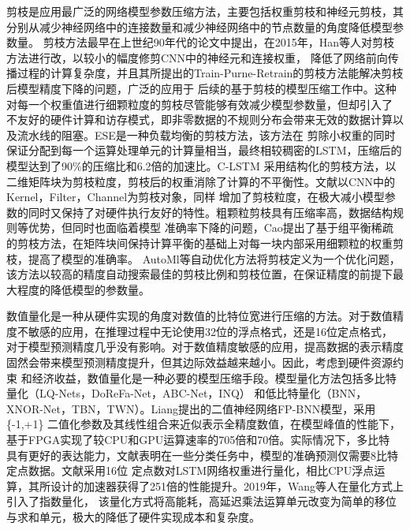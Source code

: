剪枝是应用最广泛的网络模型参数压缩方法，主要包括权重剪枝和神经元剪枝，其分别从减少神经网络中的连接数量和减少神经网络中的节点数量的角度降低模型参数量。
剪枝方法最早在上世纪90年代的论文中提出，在2015年，Han等人对剪枝方法进行改，以较小的幅度修剪CNN中的神经元和连接权重，
降低了网络前向传播过程的计算复杂度，并且其所提出的Train-Purne-Retrain的剪枝方法能解决剪枝后模型精度下降的问题，广泛的应用于
后续的基于剪枝的模型压缩工作中。这种对每一个权重值进行细颗粒度的剪枝尽管能够有效减少模型参数量，但却引入了
不友好的硬件计算和访存模式，即非零数据的不规则分布会带来无效的数据计算以及流水线的阻塞。ESE是一种负载均衡的剪枝方法，该方法在
剪除小权重的同时保证分配到每一个运算处理单元的计算量相当，最终相较稠密的LSTM，压缩后的模型达到了90\%的压缩比和6.2倍的加速比。C-LSTM
采用结构化的剪枝方法，以二维矩阵块为剪枝粒度，剪枝后的权重消除了计算的不平衡性。文献以CNN中的Kernel，Filter，Channel为剪枝对象，同样
增加了剪枝粒度，在极大减小模型参数的同时又保持了对硬件执行友好的特性。粗颗粒剪枝具有压缩率高，数据结构规则等优势，但同时也面临着模型
准确率下降的问题，Cao提出了基于组平衡稀疏的剪枝方法，在矩阵块间保持计算平衡的基础上对每一块内部采用细颗粒的权重剪枝，提高了模型的准确率。
AutoMl等自动优化方法将剪枝定义为一个优化问题，该方法以较高的精度自动搜索最佳的剪枝比例和剪枝位置，在保证精度的前提下最大程度的降低模型的参数量。

数值量化是一种从硬件实现的角度对数值的比特位宽进行压缩的方法。对于数值精度不敏感的应用，在推理过程中无论使用32位的浮点格式，还是16位定点格式，
对于模型预测精度几乎没有影响。对于数值精度敏感的应用，提高数据的表示精度固然会带来模型预测精度提升，但其边际效益越来越小。因此，考虑到硬件资源约束
和经济收益，数值量化是一种必要的模型压缩手段。模型量化方法包括多比特量化（LQ-Nets，DoReFa-Net，ABC-Net，INQ）
和低比特量化（BNN，XNOR-Net，TBN，TWN）。Liang提出的二值神经网络FP-BNN模型，采用\{-1,+1\}
二值化参数及其线性组合来近似表示全精度数值，在模型峰值的性能下，基于FPGA实现了较CPU和GPU运算速率的705倍和70倍。实际情况下，多比特
具有更好的表达能力，文献表明在一些分类任务中，模型的准确预测仅需要8比特定点数据。文献采用16位
定点数对LSTM网络权重进行量化，相比CPU浮点运算，其所设计的加速器获得了251倍的性能提升。2019年，Wang等人在量化方式上引入了指数量化，
该量化方式将高能耗，高延迟乘法运算单元改变为简单的移位与求和单元，极大的降低了硬件实现成本和复杂度。

